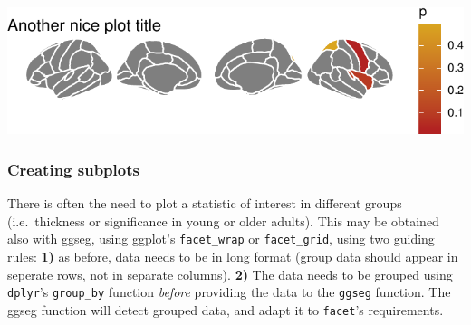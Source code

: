 \documentclass[fleqn,10pt]{wlpeerj} %
\newenvironment{Shaded}{\begin{snugshade}}{\end{snugshade}}
\newcommand{\DataTypeTok}[1]{\textcolor[rgb]{0.13,0.29,0.53}{#1}}
\newcommand{\DecValTok}[1]{\textcolor[rgb]{0.00,0.00,0.81}{#1}}
\newcommand{\KeywordTok}[1]{\textcolor[rgb]{0.13,0.29,0.53}{\textbf{#1}}}
\newcommand{\NormalTok}[1]{#1}
\newcommand{\OperatorTok}[1]{\textcolor[rgb]{0.81,0.36,0.00}{\textbf{#1}}}
\newcommand{\OtherTok}[1]{\textcolor[rgb]{0.56,0.35,0.01}{#1}}
\newcommand{\StringTok}[1]{\textcolor[rgb]{0.31,0.60,0.02}{#1}}
\begin{document}
\includegraphics{draft_2_files/figure-latex/datasuppX-1.pdf}

\hypertarget{creating-subplots}{%
\subsubsection{Creating subplots}\label{creating-subplots}}

There is often the need to plot a statistic of interest in different groups (i.e.~thickness or significance in young or older adults).
This may be obtained also with ggseg, using ggplot's \texttt{facet\_wrap} or \texttt{facet\_grid}, using two guiding rules:
\textbf{1)} as before, data needs to be in long format (group data should appear in seperate rows, not in separate columns).
\textbf{2)} The data needs to be grouped using \texttt{dplyr}'s \texttt{group\_by} function \emph{before} providing the data to the \texttt{ggseg} function.
The ggseg function will detect grouped data, and adapt it to \texttt{facet}'s requirements.

\begin{Shaded}
\end{Shaded}
\end{document}
